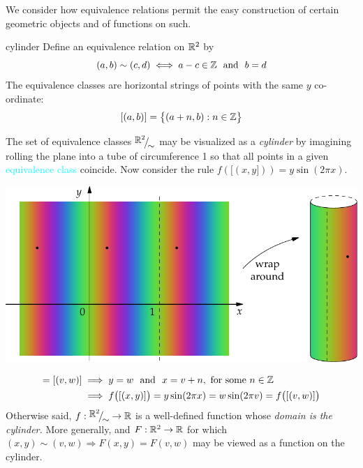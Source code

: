 
We consider how equivalence relations permit the easy construction of certain geometric objects and of functions on such.

\begin{examples}{}{cylinder}
	\exstart Define an equivalence relation on $\mathbb{R}^2$ by
	\[
		(a,b)\sim (c,d)\iff a-c\in\Z \ \text{ and }\ b=d
	\]
	The equivalence classes are horizontal strings of points with the same $y$ co-ordinate:
	\[
		[(a,b)]=\bigl\{(a+n,b):n\in\mathbb{Z}\bigr\}
	\]
	\begin{enumerate}\setcounter{enumi}{1}
	  \begin{minipage}[t]{0.53\linewidth}\vspace{-15pt}
			\item[]The set of equivalence classes $\smash[t]{\quotient{\R^2}\sim}$ may be visualized as a \emph{cylinder} by imagining rolling the plane into a tube of circumference 1 so that all points in a given \textcolor{cyan}{equivalence class} coincide.\footnotemark\medbreak
			Now consider the rule $f([(x,y]))=y\sin(2\pi x)$. %
		\end{minipage}
		\hfill
		\begin{minipage}[t]{0.45\linewidth}\vspace{-50pt}
			\hfill\includegraphics[scale=0.85]{relations-13-cylinder}
		\end{minipage}
		\par\vspace{-19pt}
		\begin{align*}
	  	[(x,y)]=[(v,w)]
	  	&\implies y=w\ \text{ and }\ x=v+n,\text{ for some $n\in\Z$}\\
	  	&\implies f\bigl([(x,y)]\bigr) =y\sin(2\pi x) 
	  	=w\sin(2\pi v) =f\bigl([(v,w)]\bigr)
	  \end{align*}
	  Otherwise said, $f:\smash{\quotient{\R^2}\sim}\to\R$ is a well-defined function whose \emph{domain is the cylinder.} More generally, and $F:\mathbb{R}^2\to\mathbb{R}$ for which $(x,y)\sim(v,w)\Longrightarrow F(x,y)=F(v,w)$ may be viewed as a function on the cylinder.
	   

\end{enumerate}
\end{examples}
